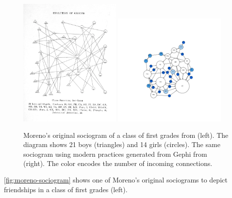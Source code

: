 \begin{figure}[!ht]
    \centering %
    \includegraphics[width=0.45\textwidth]{static/figures/RelatedWork/Moreno-1}
    \includegraphics[width=0.50\textwidth,trim={4cm 4cm 4cm 4cm},clip]{static/figures/RelatedWork/Moreno-1_GrandJean}
    \caption{Moreno's original sociogram of a class of first grades from \cite{morenoWhoShallSurvive1934} (left). The diagram shows 21 boys (triangles) and 14 girls (circles). The same sociogram using modern practices generated from Gephi from \cite{grandjeanSocialNetworkAnalysis2015} (right). The color encodes the number of incoming connections.}
    \label{fig:moreno-sociogram}
\end{figure}
\autoref{fig:moreno-sociogram} shows one of Moreno's original sociograms to depict friendships in a class of first grades (left).

